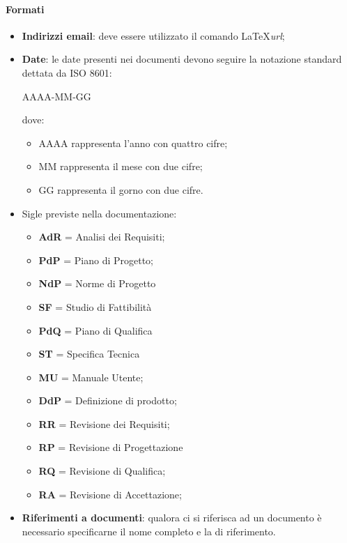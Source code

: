 \paragraph*{Formati}
\begin{itemize}
\item \textbf{Indirizzi email}: deve essere utilizzato il comando \LaTeX \textit{url};
\item \textbf{Date}: le date presenti nei documenti devono seguire la notazione standard dettata da ISO 8601:

  \begin{center}
    AAAA-MM-GG
  \end{center}
  
  dove:
  \begin{itemize}
  \item AAAA rappresenta l'anno con quattro cifre;
  \item MM rappresenta il mese con due cifre;
  \item GG rappresenta il gorno con due cifre.
  \end{itemize}
\item Sigle previste nella documentazione:
  \begin{itemize}
  \item \textbf{AdR} = Analisi dei Requisiti;
  \item \textbf{PdP} = Piano di Progetto;
  \item \textbf{NdP} = Norme di Progetto
  \item \textbf{SF} = Studio di Fattibilità
  \item \textbf{PdQ} = Piano di Qualifica
  \item \textbf{ST} = Specifica Tecnica
  \item \textbf{MU} = Manuale Utente;
  \item \textbf{DdP} = Definizione di prodotto;
  \item \textbf{RR} = Revisione dei Requisiti;
  \item \textbf{RP} = Revisione di Progettazione
  \item \textbf{RQ} = Revisione di Qualifica;
  \item \textbf{RA} = Revisione di Accettazione;
  \end{itemize}
\item \textbf{Riferimenti a documenti}: qualora ci si riferisca ad un documento è necessario specificarne il nome completo e la  di riferimento.
\end{itemize}

